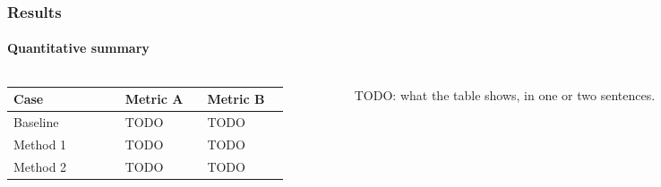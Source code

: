 
\begin{frame}
	\frametitle{Results}
	\framesubtitle{Quantitative summary}

	\begin{columns}[T]
		\begin{column}{0.48\linewidth}
			\begin{tabular}{L{0.34\linewidth} C{0.25\linewidth} R{0.25\linewidth}}
				\toprule
				Case & Metric A & Metric B\\
				\midrule
				Baseline & TODO & TODO\\
				Method 1 & TODO & TODO\\
				Method 2 & TODO & TODO\\
				\bottomrule
			\end{tabular}
		\end{column}
		\begin{column}{0.48\linewidth}
			TODO: what the table shows, in one or two sentences.
		\end{column}
	\end{columns}
\end{frame}
